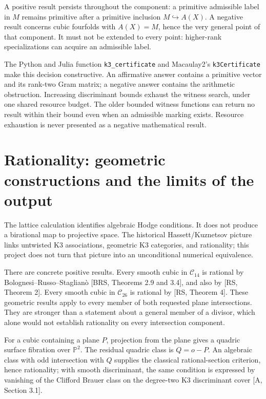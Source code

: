 \documentclass[
  american,
  11pt,
  a4paper,
]{article}
\begin{document}
A positive result persists throughout the component: a primitive
admissible label in \(M\) remains primitive after a primitive inclusion
\(M\hookrightarrow A(X)\). A negative result concerns cubic fourfolds
with \(A(X)=M\), hence the very general point of that component. It must
not be extended to every point: higher-rank specializations can acquire
an admissible label.

The Python and Julia function \texttt{k3\_certificate} and Macaulay2's
\texttt{k3Certificate} make this decision constructive. An affirmative
answer contains a primitive vector and its rank-two Gram matrix; a
negative answer contains the arithmetic obstruction. Increasing
discriminant bounds exhaust the witness search, under one shared
resource budget. The older bounded witness functions can return no
result within their bound even when an admissible marking exists.
Resource exhaustion is never presented as a negative mathematical
result.

\section{Rationality: geometric constructions and the limits of the
output}\label{rationality-geometric-constructions-and-the-limits-of-the-output}

The lattice calculation identifies algebraic Hodge conditions. It does
not produce a birational map to projective space. The historical
Hassett/Kuznetsov picture links untwisted K3 associations, geometric K3
categories, and rationality; this project does not turn that picture
into an unconditional numerical equivalence.

There are concrete positive results. Every smooth cubic in
\(\mathcal C_{14}\) is rational by Bolognesi--Russo--Staglianò {[}BRS,
Theorems 2.9 and 3.4{]}, and also by {[}RS, Theorem 2{]}. Every smooth
cubic in \(\mathcal C_{26}\) is rational by {[}RS, Theorem 4{]}. These
geometric results apply to every member of both requested plane
intersections. They are stronger than a statement about a general member
of a divisor, which alone would not establish rationality on every
intersection component.

For a cubic containing a plane \(P\), projection from the plane gives a
quadric surface fibration over \(\mathbb P^2\). The residual quadric
class is \(Q=o-P\). An algebraic class with odd intersection with \(Q\)
supplies the classical rational-section criterion, hence rationality;
with smooth discriminant, the same condition is expressed by vanishing
of the Clifford Brauer class on the degree-two K3 discriminant cover
{[}A, Section 3.1{]}.
\end{document}
